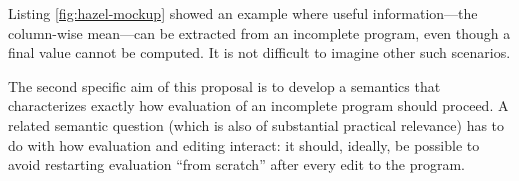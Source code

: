 Listing \ref{fig:hazel-mockup} showed an example where
useful information---the column-wise mean---can be extracted from an incomplete program, even though a final value cannot be computed. It is not difficult to imagine other such scenarios.

The second specific aim of this proposal is to develop a semantics that characterizes exactly how
evaluation of an incomplete program should proceed. A related semantic question (which is also of 
substantial practical relevance) has to do with how 
evaluation and editing interact: it should, ideally, be possible to avoid restarting
evaluation ``from scratch'' after every edit to the program.


